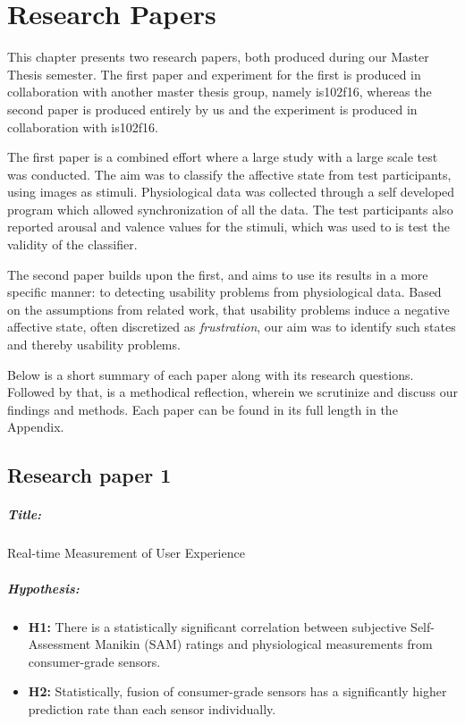 \chapter{Research Papers}
This chapter presents two research papers, both produced during our Master
Thesis semester. The first paper and experiment for the first is produced in collaboration with another
master thesis group, namely is102f16, whereas the second paper is produced entirely by us and the experiment is produced in collaboration with is102f16.

The first paper is a combined effort where a large study with a large scale test was conducted.
The aim was to classify the affective state from test participants, using images as stimuli.
Physiological data was collected through a self developed program which allowed synchronization of all the data.
The test participants also reported arousal and valence values for the stimuli, which was used to is test the validity of the classifier.

The second paper builds upon the first, and aims to use its results in a more
specific manner: to detecting usability problems from physiological
data. Based on the assumptions from related work, that usability problems
induce a negative affective state, often discretized as \textit{frustration},
our aim was to identify such states and thereby usability problems.

Below is a short summary of each paper along with its research questions.
Followed by that, is a methodical reflection, wherein we scrutinize and discuss
our findings and methods. Each paper can be found in its full length in the
Appendix.

\section{Research paper 1}
\paragraph{Title:}
Real-time Measurement of User Experience
\paragraph{Hypothesis:}
\begin{itemize}
    \item \textbf{H1:} There is a statistically significant
      correlation between subjective Self-Assessment Manikin (SAM) ratings and physiological
      measurements from consumer-grade sensors.
    \item \textbf{H2:} Statistically, fusion of consumer-grade sensors
      has a significantly higher prediction rate than each sensor
      individually.
\end{itemize}
